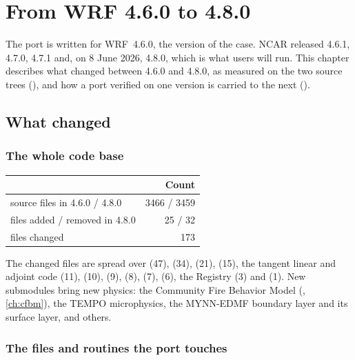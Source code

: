\chapter{From WRF 4.6.0 to 4.8.0}\label{ch:versions}

The port is written for WRF~4.6.0, the version of the case. NCAR released 4.6.1, 4.7.0, 4.7.1 and, on 8 June 2026,
4.8.0, which is what users will run. This chapter describes what changed between 4.6.0 and 4.8.0, as measured on the
two source trees (), and how a port verified on one version is carried
to the next ().

\section{What changed}

\subsection{The whole code base}

\begin{center}
\small
\begin{tabular}{lr}
\toprule
 & Count \\
\midrule
source files in 4.6.0 / 4.8.0 & 3466 / 3459 \\
files added / removed in 4.8.0 & 25 / 32 \\
files changed & 173 \\
\bottomrule
\end{tabular}
\end{center}
The changed files are spread over  (47),  (34),  (21),  (15), the tangent
linear and adjoint code (11),  (10),  (9),  (8),  (7),
 (6), the Registry (3) and  (1). New submodules bring new physics: the Community Fire Behavior
Model (, \cref{ch:cfbm}), the TEMPO microphysics, the MYNN-EDMF boundary layer and its
surface layer, and others.

\subsection{The files and routines the port touches}

